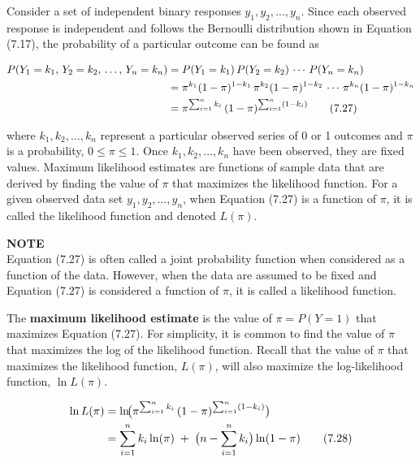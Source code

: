 \documentclass[
]{report}
\begin{document}
Consider a set of independent binary responses \(y_1, y_2, \dots, y_n\). Since each observed response is independent and follows the Bernoulli distribution shown in Equation (7.17), the probability of a particular outcome can be found as

\begin{align}
P(Y_1 = k_1,\,Y_2 = k_2,\,\dots,\,Y_n = k_n) 
&= P(Y_1 = k_1)\,P(Y_2 = k_2)\,\cdots\,P(Y_n = k_n) \notag \\
&= \pi^{k_1}(1 - \pi)^{1-k_1}\,\pi^{k_2}(1 - \pi)^{1-k_2}\,\cdots\,\pi^{k_n}(1 - \pi)^{1-k_n} \notag \\
&= \pi^{\sum_{i=1}^n k_i}\,(1 - \pi)^{\sum_{i=1}^n (1 - k_i)}
\tag{7.27}
\end{align}

where \(k_1, k_2, \dots, k_n\) represent a particular observed series of 0 or 1 outcomes and \(\pi\) is a probability, \(0 \le \pi \le 1\). Once \(k_1, k_2, \dots, k_n\) have been observed, they are fixed values. Maximum likelihood estimates are functions of sample data that are derived by finding the value of \(\pi\) that maximizes the likelihood function. For a given observed data set \(y_1, y_2, \dots, y_n\), when Equation (7.27) is a function of \(\pi\), it is called the likelihood function and denoted \(L(\pi)\).

\large

\textbf{NOTE}\\
Equation (7.27) is often called a joint probability function when considered as a function of the data. However, when the data are assumed to be fixed and Equation (7.27) is considered a function of \(\pi\), it is called a likelihood function.\\
\normalsize

The \textbf{maximum likelihood estimate} is the value of \(\pi = P(Y = 1)\) that maximizes Equation (7.27). For simplicity, it is common to find the value of \(\pi\) that maximizes the log of the likelihood function. Recall that the value of \(\pi\) that maximizes the likelihood function, \(L(\pi)\), will also maximize the log-likelihood function, \(\ln L(\pi)\).

\begin{align}
\ln L(\pi)
&= \ln\!\bigl(\pi^{\sum_{i=1}^n k_i}\,(1 - \pi)^{\sum_{i=1}^n (1 - k_i)}\bigr) \notag \\
&= \sum_{i=1}^n k_i \ln(\pi)\;+\;\bigl(n - \sum_{i=1}^n k_i\bigr)\ln(1 - \pi)
\tag{7.28}
\end{align}

\large
\end{document}
